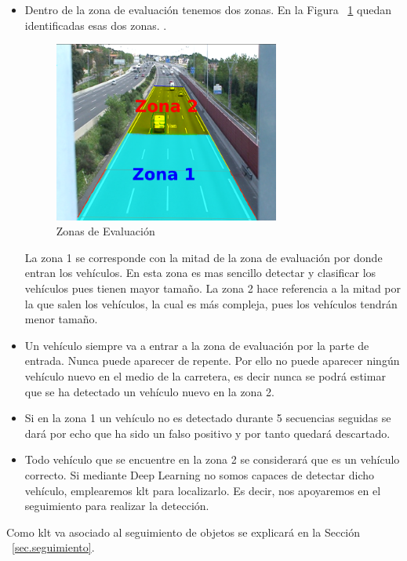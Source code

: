 \begin{itemize}
    \item Dentro de la zona de evaluación tenemos dos zonas. En la
     Figura ~\ref{fig.zona_evaluacion} quedan identificadas esas dos zonas.
.    \begin{figure}
\begin{center}
	\includegraphics[width=0.7\textwidth]{figures/Diseno_global/zonas_evaluacion.png}
   \caption{Zonas de Evaluación}
	\label{fig.zona_evaluacion}
\end{center}
\end{figure}
    La zona 1 se corresponde con la mitad de la zona de evaluación por donde entran los vehículos. En esta zona es mas sencillo detectar y clasificar los vehículos pues tienen mayor tamaño. La zona 2 hace referencia a la mitad por la que salen los vehículos, la cual es más compleja, pues los vehículos tendrán menor tamaño.
    \item Un vehículo siempre va a entrar a la zona de evaluación por la parte de entrada. Nunca puede aparecer de repente. Por ello no puede aparecer ningún vehículo nuevo en el medio de la carretera, es decir nunca se podrá estimar que se ha detectado un vehículo nuevo en la zona 2.
    \item Si en la zona 1 un vehículo no es detectado durante 5 secuencias seguidas se dará por echo que ha sido un falso positivo y por tanto quedará descartado.
    \item Todo vehículo que se encuentre en la zona 2 se considerará que es un vehículo correcto. Si mediante Deep Learning no somos capaces de detectar dicho vehículo, emplearemos \acrshort{klt} para localizarlo. Es decir, nos apoyaremos en el seguimiento para realizar la detección.
\end{itemize}

Como \acrshort{klt} va asociado al seguimiento de objetos se explicará en la Sección ~\ref{sec.seguimiento}.


